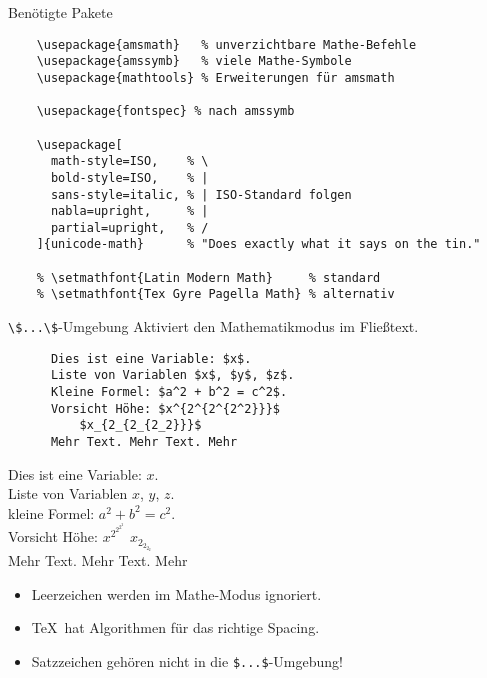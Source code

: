 \begin{frame}[fragile]{
  Benötigte Pakete
  \hfill{}
}
  \begin{lstlisting}
    \usepackage{amsmath}   % unverzichtbare Mathe-Befehle
    \usepackage{amssymb}   % viele Mathe-Symbole
    \usepackage{mathtools} % Erweiterungen für amsmath

    \usepackage{fontspec} % nach amssymb

    \usepackage[
      math-style=ISO,    % \
      bold-style=ISO,    % |
      sans-style=italic, % | ISO-Standard folgen
      nabla=upright,     % |
      partial=upright,   % /
    ]{unicode-math}      % "Does exactly what it says on the tin."

    % \setmathfont{Latin Modern Math}     % standard
    % \setmathfont{Tex Gyre Pagella Math} % alternativ
  \end{lstlisting}
\end{frame}

\begin{frame}[fragile]{\lstinline+\$...\$+-Umgebung}
  Aktiviert den Mathematikmodus im Fließtext.

  \begin{CodeExample}{0.56}
    \begin{lstlisting}
      Dies ist eine Variable: $x$.
      Liste von Variablen $x$, $y$, $z$.
      Kleine Formel: $a^2 + b^2 = c^2$.
      Vorsicht Höhe: $x^{2^{2^{2^2}}}$
          $x_{2_{2_{2_2}}}$
      Mehr Text. Mehr Text. Mehr
    \end{lstlisting}
  \CodeResult
    Dies ist eine Variable: $x$. \\
    Liste von Variablen $x$, $y$, $z$. \\
    kleine Formel: $a^2 + b^2 = c^2$. \\
    Vorsicht Höhe: $x^{2^{2^{2^2}}}$ $x_{2_{2_{2_2}}}$ \\
    Mehr Text. Mehr Text. Mehr
  \end{CodeExample}

  \vspace{1em}
  \begin{itemize}
    \item Leerzeichen werden im Mathe-Modus ignoriert.
    \item \TeX\ hat Algorithmen für das richtige Spacing.
    \item Satzzeichen gehören nicht in die \lstinline+$...$+-Umgebung!
  \end{itemize}
\end{frame}

